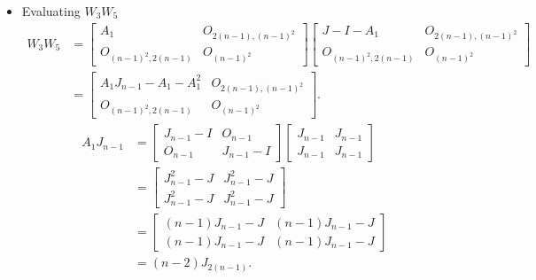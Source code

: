 \begin{itemize}
    \item Evaluating $W_3W_5$
    \begin{align*}
        W_3W_5
        &=\begin{bmatrix}
            A_1 & O_{2(n-1), (n-1)^2} \\
            O_{(n-1)^2, 2(n-1)} & O_{(n-1)^2}
        \end{bmatrix}\begin{bmatrix}
            J-I-A_1 & O_{2(n-1), (n-1)^2} \\
            O_{(n-1)^2, 2(n-1)} & O_{(n-1)^2}
        \end{bmatrix} \\
        &= \begin{bmatrix}
            A_1J_{n-1} - A_1 - A_1^2 & O_{2(n-1), (n-1)^2} \\
            O_{(n-1)^2, 2(n-1)} & O_{(n-1)^2}
        \end{bmatrix}.
    \end{align*}
    \begin{align*}
        A_1J_{n-1} &= \begin{bmatrix}
            J_{n-1}-I & O_{n-1} \\
            O_{n-1} & J_{n-1}-I
        \end{bmatrix}\begin{bmatrix}
            J_{n-1} & J_{n-1} \\
            J_{n-1} & J_{n-1}
        \end{bmatrix} \\
        &= \begin{bmatrix}
            J_{n-1}^2-J & J_{n-1}^2-J \\
            J_{n-1}^2-J & J_{n-1}^2-J
        \end{bmatrix}\\
        &= \begin{bmatrix}
            (n-1)J_{n-1}-J & (n-1)J_{n-1}-J \\
            (n-1)J_{n-1}-J & (n-1)J_{n-1}-J
        \end{bmatrix} \\
        &= (n-2)J_{2(n-1)}.
    \end{align*}


\end{itemize}
